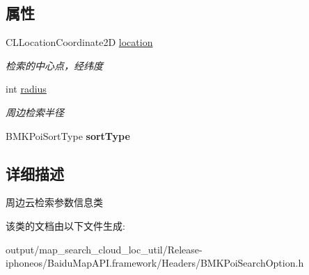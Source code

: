 \subsection*{属性}
\begin{DoxyCompactItemize}
\item 
\hypertarget{interface_b_m_k_nearby_search_option_ac03907184a27878ce07e1fce8ee38d3e}{}C\+L\+Location\+Coordinate2\+D \hyperlink{interface_b_m_k_nearby_search_option_ac03907184a27878ce07e1fce8ee38d3e}{location}\label{interface_b_m_k_nearby_search_option_ac03907184a27878ce07e1fce8ee38d3e}

\begin{DoxyCompactList}\small\item\em 检索的中心点，经纬度 \end{DoxyCompactList}\item 
\hypertarget{interface_b_m_k_nearby_search_option_ad3a9f2d3cc3668165c229741b8791f90}{}int \hyperlink{interface_b_m_k_nearby_search_option_ad3a9f2d3cc3668165c229741b8791f90}{radius}\label{interface_b_m_k_nearby_search_option_ad3a9f2d3cc3668165c229741b8791f90}

\begin{DoxyCompactList}\small\item\em 周边检索半径 \end{DoxyCompactList}\item 
\hypertarget{interface_b_m_k_nearby_search_option_a2b99b1326bfe03cb14a69fe592b3a6e9}{}B\+M\+K\+Poi\+Sort\+Type {\bfseries sort\+Type}\label{interface_b_m_k_nearby_search_option_a2b99b1326bfe03cb14a69fe592b3a6e9}

\end{DoxyCompactItemize}


\subsection{详细描述}
周边云检索参数信息类 

该类的文档由以下文件生成\+:\begin{DoxyCompactItemize}
\item 
output/map\+\_\+search\+\_\+cloud\+\_\+loc\+\_\+util/\+Release-\/iphoneos/\+Baidu\+Map\+A\+P\+I.\+framework/\+Headers/B\+M\+K\+Poi\+Search\+Option.\+h\end{DoxyCompactItemize}
